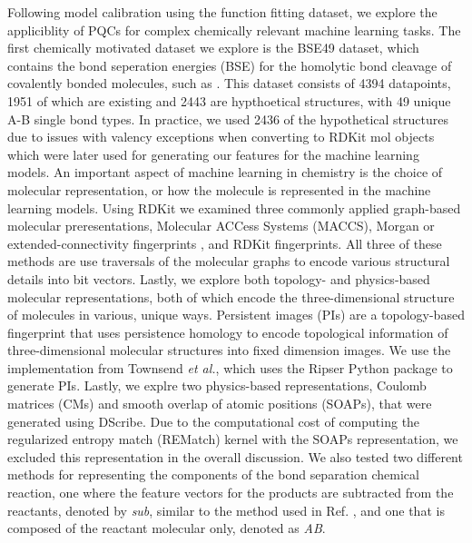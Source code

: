 \documentclass[journal=jacsat,manuscript=article]{achemso}
\begin{document}
Following model calibration using the function fitting dataset, we explore the appliciblity of PQCs for complex chemically relevant machine learning tasks.
The first chemically motivated dataset we explore is the BSE49 dataset, which contains the bond seperation energies (BSE)  for the homolytic bond cleavage of covalently bonded molecules, such as .\cite{prasad_bse49_2021}
This dataset consists of 4394 datapoints, 1951 of which are existing and 2443 are hypthoetical structures, with 49 unique A-B single bond types.
In practice, we used 2436 of the hypothetical structures due to issues with valency exceptions when converting to RDKit mol objects which were later used for generating our features for the machine learning models.
An important aspect of machine learning in chemistry is the choice of molecular representation, or how the molecule is represented in the machine learning models.\cite{jones_molecular_2023}
Using RDKit\cite{noauthor_rdkit_nodate} we examined three commonly applied graph-based molecular preresentations, Molecular ACCess Systems (MACCS)\cite{durant_reoptimization_2002}, Morgan or extended-connectivity fingerprints \cite{morgan_generation_1965,rogers_extended-connectivity_2010}, and RDKit fingerprints.
All three of these methods are use traversals of the molecular graphs to encode various structural details into bit vectors.
Lastly, we explore both topology- and physics-based molecular representations, both of which encode the three-dimensional structure of molecules in various, unique ways.
Persistent images (PIs) are a topology-based fingerprint that uses persistence homology to encode topological information of three-dimensional molecular structures into fixed dimension images.\cite{adams_persistence_2017,townsend_representation_2020,schiff_augmenting_2022} 
We use the implementation from Townsend \textit{et al.}\cite{townsend_representation_2020}, which uses the Ripser Python package to generate PIs.\cite{tralie_ripserpy_2018}
Lastly, we explre two physics-based representations, Coulomb matrices (CMs) \cite{rupp_fast_2012} and smooth overlap of atomic positions (SOAPs), that were generated using DScribe.\cite{de_comparing_2016}
Due to the computational cost of computing the regularized entropy match (REMatch) kernel  with the SOAPs representation, we excluded this representation in the overall discussion.
We  also tested two different methods for representing the components of the bond separation chemical reaction, one where the feature vectors for the products are subtracted from the reactants, denoted by \textit{sub}, similar to the method used in Ref. \cite{garcia-andrade_barrier_2023}, and one that is composed of the reactant molecular only, denoted as \textit{AB}.
\end{document}
